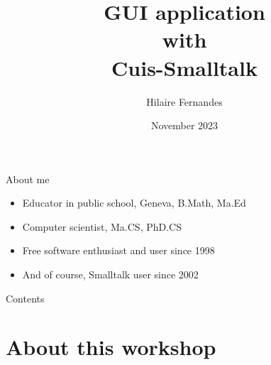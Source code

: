 \documentclass{beamer}
\title{GUI application\\ with\\ Cuis-Smalltalk}
\author{Hilaire Fernandes}
\institute[DIP, Geneva]{Department of Public Instruction \\ Geneva}
\date{November 2023}
\begin{document}
\begin{frame}
  \titlepage
\end{frame}
%
\begin{frame}{About me}
  \fontsize{12pt}{30pt}\selectfont
  \begin{itemize}
  \item Educator in public school, Geneva, B.Math, Ma.Ed
  \item Computer scientist, Ma.CS, PhD.CS
  \item Free software enthusiast and user since 1998
  \item And of course, Smalltalk user since 2002
  \end{itemize}
\end{frame}
%
\begin{frame}{Contents}
  \tableofcontents[hideallsubsections]
\end{frame}

\section{About this workshop}
\end{document}
